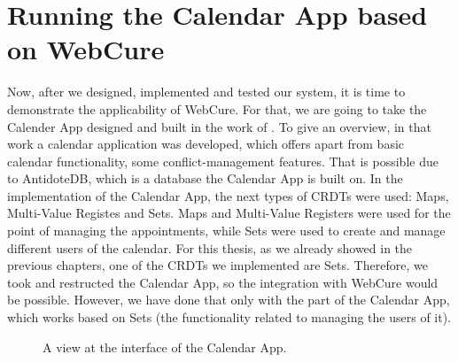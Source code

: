 \section{Running the Calendar App based on WebCure}

Now, after we designed, implemented and tested our system, it is time to demonstrate the applicability of WebCure. For that, we are going to take the Calender App designed and built in the work of \citet{54}. To give an overview, in that work a calendar application was developed, which offers apart from basic calendar functionality, some conflict-management features. That is possible due to AntidoteDB, which is a database the Calendar App is built on. In the implementation of the Calendar App, the next types of CRDTs were used: Maps, Multi-Value Registes and Sets. Maps and Multi-Value Registers were used for the point of managing the appointments, while Sets were used to create and manage different users of the calendar. For this thesis, as we already showed in the previous chapters, one of the CRDTs we implemented are Sets. Therefore, we took and restructed the Calendar App, so the integration with WebCure would be possible. However, we have done that only with the part of the Calendar App, which works based on Sets (the functionality related to managing the users of it).

\begin{figure}[!htb]
    \begin{center}
    \setlength{\fboxsep}{4pt}%
    \setlength{\fboxrule}{1pt}%
    {\scriptsize%
     }
    \caption {A view at the interface of the Calendar App.}
    \label{fig:ev-fig-1}
\end{center}
\end{figure}

